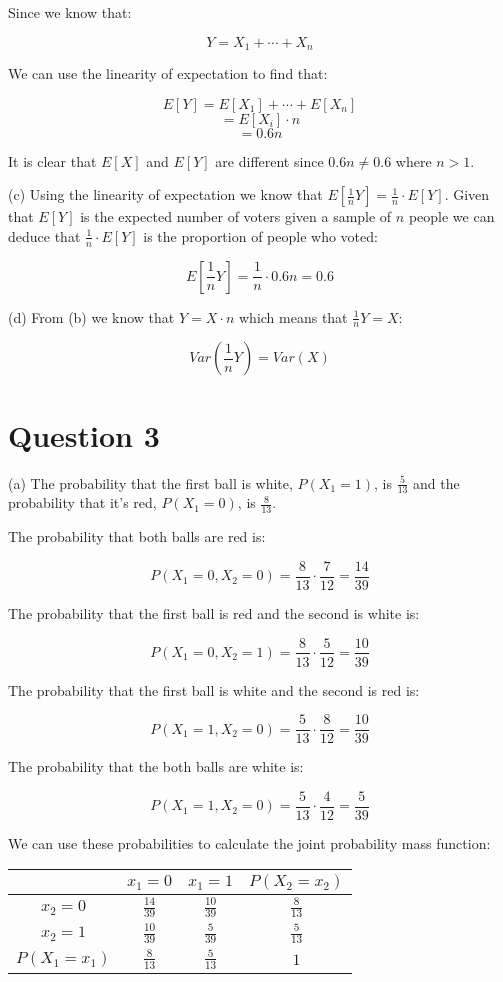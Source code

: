 \documentclass[12pt]{article}
\begin{document}
\indent Since we know that:

$$Y = X_1 + \cdots + X_n$$

\indent We can use the linearity of expectation to find that:

$$E[Y] = E[X_1] + \cdots + E[X_n]$$
$$= E[X_i] \cdot n$$
$$= 0.6n$$

\indent It is clear that $E[X]$ and $E[Y]$ are different since $0.6n \neq 0.6$ where $n > 1$.

\noindent (c) Using the linearity of expectation we know that $E[\frac{1}{n}Y] = \frac{1}{n} \cdot E[Y]$. Given that $E[Y]$ is the expected number of voters given a sample of $n$ people we can deduce that $\frac{1}{n} \cdot E[Y]$ is the proportion of people who voted:

$$E[\frac{1}{n}Y] = \frac{1}{n} \cdot 0.6n = 0.6$$

\noindent (d) From (b) we know that $Y = X \cdot n$ which means that $\frac{1}{n}Y = X$:

$$Var(\frac{1}{n}Y) = Var(X)$$

\section*{Question 3}

\noindent (a) The probability that the first ball is white, $P(X_1 = 1)$, is $\frac{5}{13}$ and the probability that it's red, $P(X_1 = 0)$, is $\frac{8}{13}$.

\indent The probability that both balls are red is:

$$P(X_1 = 0, X_2 = 0) = \frac{8}{13} \cdot \frac{7}{12} = \frac{14}{39}$$

\indent The probability that the first ball is red and the second is white is:

$$P(X_1 = 0, X_2 = 1) = \frac{8}{13} \cdot \frac{5}{12} = \frac{10}{39}$$

\indent The probability that the first ball is white and the second is red is:

$$P(X_1 = 1, X_2 = 0) = \frac{5}{13} \cdot \frac{8}{12} = \frac{10}{39}$$

\indent The probability that the both balls are white is:

$$P(X_1 = 1, X_2 = 0) = \frac{5}{13} \cdot \frac{4}{12} = \frac{5}{39}$$

\indent We can use these probabilities to calculate the joint probability mass function:

\begin{center}
    \begin{tabular}{c|c|c|c} 
         & $x_{1}=0$ & $x_{1}=1$ & $P(X_{2}=x_{2})$ \\
        \hline
        $x_{2}=0$ & $\frac{14}{39}$ & $\frac{10}{39}$ & $\frac{8}{13}$ \\ 
        $x_{2}=1$ & $\frac{10}{39}$ & $\frac{5}{39}$ & $\frac{5}{13}$ \\  
        $P(X_{1}=x_1)$ & $\frac{8}{13}$ & $\frac{5}{13}$ & $1$
    \end{tabular}
\end{center}
\end{document}
